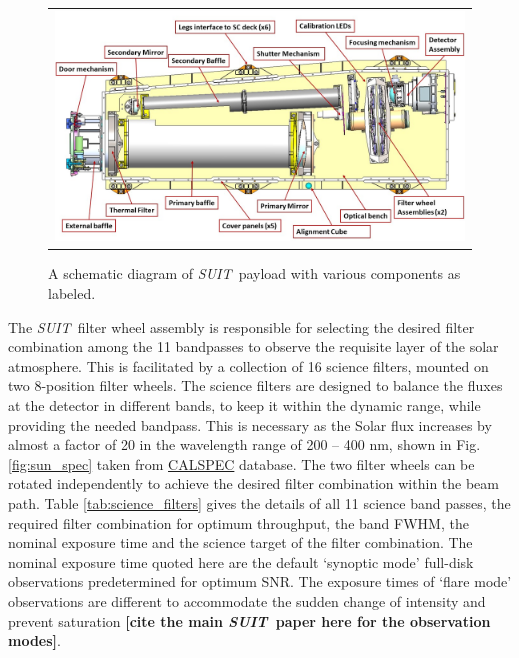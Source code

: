 \documentclass[12pt]{spieman}  %
\newcommand{\suit}{{\it SUIT~}}
\newcommand{\sr}[1]{{\bf\color{red} [#1]}}
\begin{document}
\begin{figure}[ht!]
\begin{center}
\begin{tabular}{c}
\includegraphics[width=0.8\linewidth]{SUITLayout.jpg}
\end{tabular}
\end{center}
\caption 
{ \label{fig:suit} A schematic diagram of \suit payload with various components as labeled. } 
\end{figure} 

The \suit filter wheel assembly is responsible for selecting the desired filter combination among the 11 bandpasses to observe the requisite layer of the solar atmosphere. This is facilitated by a collection of 16 science filters, mounted on two 8-position filter wheels. The science filters are designed to balance the fluxes at the detector in different bands, to keep it within the dynamic range, while providing the needed bandpass. This is necessary as the Solar flux increases by almost a factor of 20 in the wavelength range of 200 {--} 400 nm, shown in Fig. \ref{fig:sun_spec} taken from \href{https://www.stsci.edu/hst/instrumentation/reference-data-for-calibration-and-tools/astronomical-catalogs/calspec}{CALSPEC} \cite{bohlin14,bohlin20,bohlin22} database. The two filter wheels can be rotated independently to achieve the desired filter combination within the beam path. Table \ref{tab:science_filters} gives the details of all 11 science band passes, the required filter combination for optimum throughput, the band FWHM, the nominal exposure time and the science target of the filter combination. The nominal exposure time quoted here are the default `synoptic mode' full-disk observations predetermined for optimum SNR. The exposure times of `flare mode' observations are different to accommodate the sudden change of intensity and prevent saturation \sr{cite the main \suit paper here for the observation modes}.
\end{document}
